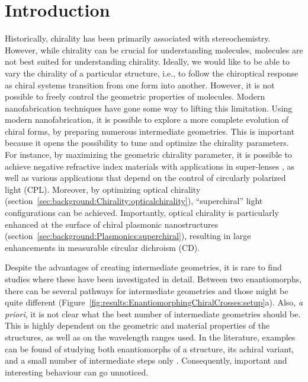 \section{Introduction}\label{sec:results:EnantiomorphingChiralCrosses:introduction}
Historically, chirality has been primarily associated with stereochemistry. However, while chirality can be crucial for understanding molecules, molecules are not best suited for understanding chirality. 
Ideally, we would like to be able to vary the chirality of a particular structure, i.e., to follow the chiroptical response as chiral systems transition from one form into another. However, it is not possible to freely control the geometric properties of molecules. Modern nanofabrication techniques have gone some way to lifting this limitation.
Using modern nanofabrication, it is possible to explore a more complete evolution of chiral forms, by preparing numerous intermediate geometries. This is important because it opens the possibility to tune and optimize the chirality parameters. For instance, by maximizing the geometric chirality parameter, it is possible to achieve negative refractive index materials with applications in super-lenses \cite{Khorasaninejad2016}, as well as various applications that depend on the control of circularly polarized light (CPL). 
Moreover, by optimizing optical chirality (section~\ref{sec:background:Chirality:opticalchirality}), ``superchiral'' light configurations can be achieved. Importantly, optical chirality is particularly enhanced at the surface of chiral plasmonic nanostructures (section~\ref{sec:background:Plasmonics:superchiral}), resulting in large enhancements in measurable circular dichroism (CD).

Despite the advantages of creating intermediate geometries, it is rare to find studies where these have been investigated in detail. Between two enantiomorphs, there can be several pathways for intermediate geometries and those might be quite different (Figure~\ref{fig:results:EnantiomorphingChiralCrosses:setup}a). 
Also, \textit{a priori}, it is not clear what the best number of intermediate geometries should be. This is highly dependent on the geometric and material properties of the structures, as well as on the wavelength ranges used. In the literature, examples can be found of studying both enantiomorphs of a structure, its achiral variant, and a small number of intermediate steps only \cite{Zu2016}. Consequently, important and interesting behaviour can go unnoticed.

